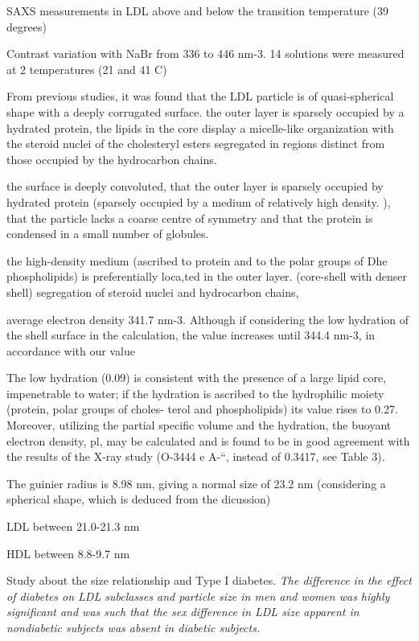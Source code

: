 SAXS measurements in LDL above and below the transition temperature (39 degrees)

Contrast variation with NaBr from 336 to 446 nm-3. 14 solutions were measured at 2 temperatures (21 and 41 C)

From previous studies, it was found that the LDL particle is of quasi-spherical shape with a deeply corrugated surface. the outer layer is sparsely occupied by a hydrated protein, the lipids in the core display a micelle-like organization with the steroid nuclei of the cholesteryl esters segregated in regions distinct from those occupied by the hydrocarbon chains. 

the surface is deeply convoluted, that the outer layer is sparsely occupied by hydrated protein (sparsely occupied by a medium of relatively high density. ), that the particle lacks a coarse centre of symmetry and that the protein is condensed in a small number of globules. 

the high-density medium (ascribed to protein and to the polar groups of Dhe phospholipids) is preferentially loca,ted in the outer layer.  (core-shell with denser shell) segregation  of steroid nuclei and hydrocarbon chains, 

average electron density 341.7 nm-3. Although if considering the low hydration of the shell surface in the calculation, the value increases until 344.4 nm-3, in accordance with our value

The low hydration (0.09) is consistent with the presence of a large lipid core, impenetrable to water; if the hydration is ascribed to the hydrophilic moiety (protein, polar groups of choles- terol and phospholipids) its value rises to 0.27. Moreover, utilizing the partial specific volume and the hydration, the buoyant electron density, pl, may be calculated and is found to be in good agreement with the results of the X-ray study (O-3444 e A-“, instead of 0.3417, see Table 3). 

The guinier radius is 8.98 nm, giving a normal size of 23.2 nm (considering a spherical shape, which is deduced from the dicussion)
 
\cite{colhoun_lipoprotein_2002}

LDL between 21.0-21.3 nm

HDL between 8.8-9.7 nm

Study about the size relationship and Type I diabetes. \emph{The  difference  in  the  effect  of  diabetes  on  LDL subclasses and particle size in men and women was highly significant and was such that the sex difference in LDL size apparent  in  nondiabetic  subjects  was  absent  in  diabetic subjects.}

